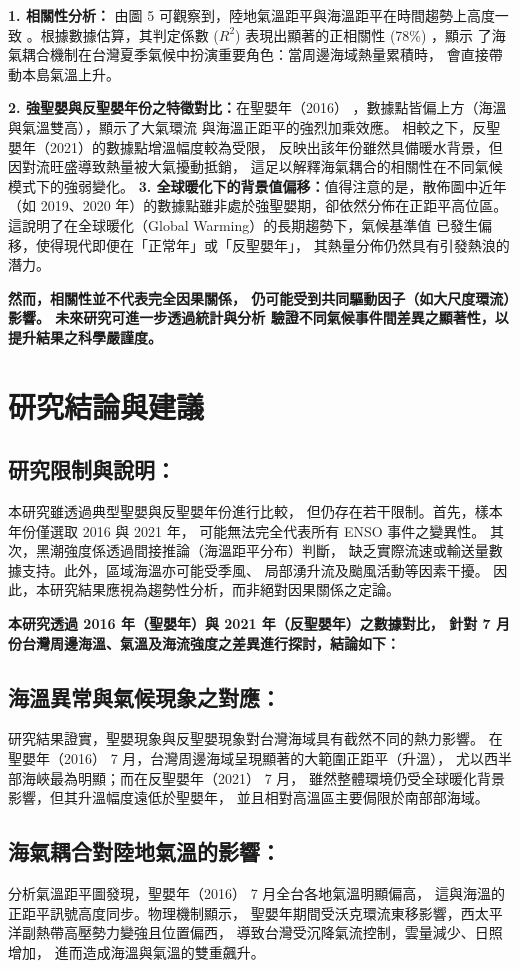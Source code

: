 \documentclass[UTF8, fontset=none,12pt]{ctexart}
\begin{document}
\textbf{1. 相關性分析：}
由圖 5 可觀察到，陸地氣溫距平與海溫距平在時間趨勢上高度一致
 。根據數據估算，其判定係數 ($R^2$) 表現出顯著的正相關性 (78\%) ，顯示
 了海氣耦合機制在台灣夏季氣候中扮演重要角色：當周邊海域熱量累積時，
 會直接帶動本島氣溫上升。

\textbf{2. 強聖嬰與反聖嬰年份之特徵對比：}在聖嬰年（2016）
，數據點皆偏上方（海溫與氣溫雙高），顯示了大氣環流
與海溫正距平的強烈加乘效應。
相較之下，反聖嬰年（2021）的數據點增溫幅度較為受限，
反映出該年份雖然具備暖水背景，但因對流旺盛導致熱量被大氣擾動抵銷，
這足以解釋海氣耦合的相關性在不同氣候模式下的強弱變化。
\textbf{3. 全球暖化下的背景值偏移：}值得注意的是，散佈圖中近年
（如 2019、2020 年）的數據點雖非處於強聖嬰期，卻依然分佈在正距平高位區。
這說明了在全球暖化（Global Warming）的長期趨勢下，氣候基準值
已發生偏移，使得現代即便在「正常年」或「反聖嬰年」，
其熱量分佈仍然具有引發熱浪的潛力。
    
{\bfseries\selectfont 然而，相關性並不代表完全因果關係，
仍可能受到共同驅動因子（如大尺度環流）影響。
未來研究可進一步透過統計與分析
驗證不同氣候事件間差異之顯著性，以提升結果之科學嚴謹度。}
\section{研究結論與建議}
\subsection*{研究限制與說明：}
本研究雖透過典型聖嬰與反聖嬰年份進行比較，
但仍存在若干限制。首先，樣本年份僅選取 2016 與 2021 年，
可能無法完全代表所有 ENSO 事件之變異性。
其次，黑潮強度係透過間接推論（海溫距平分布）判斷，
缺乏實際流速或輸送量數據支持。此外，區域海溫亦可能受季風、
局部湧升流及颱風活動等因素干擾。
因此，本研究結果應視為趨勢性分析，而非絕對因果關係之定論。
\vspace{1em}

{\bfseries \selectfont
本研究透過 2016 年（聖嬰年）與 2021 年（反聖嬰年）之數據對比，
針對 7 月份台灣周邊海溫、氣溫及海流強度之差異進行探討，結論如下：
}
\subsection*{海溫異常與氣候現象之對應：}
研究結果證實，聖嬰現象與反聖嬰現象對台灣海域具有截然不同的熱力影響。
在聖嬰年（2016） 7 月，台灣周邊海域呈現顯著的大範圍正距平（升溫），
尤以西半部海峽最為明顯；而在反聖嬰年（2021） 7 月，
雖然整體環境仍受全球暖化背景影響，但其升溫幅度遠低於聖嬰年，
並且相對高溫區主要侷限於南部部海域。
\subsection*{海氣耦合對陸地氣溫的影響：}
分析氣溫距平圖發現，聖嬰年（2016） 7 月全台各地氣溫明顯偏高，
這與海溫的正距平訊號高度同步。物理機制顯示，
聖嬰年期間受沃克環流東移影響，西太平洋副熱帶高壓勢力變強且位置偏西，
導致台灣受沉降氣流控制，雲量減少、日照增加，
進而造成海溫與氣溫的雙重飆升。
\end{document}
